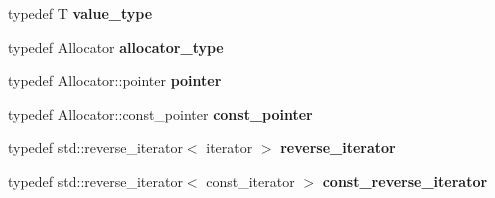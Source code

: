 \begin{DoxyCompactItemize}
\item 
\hypertarget{classyasli_1_1vector_aabb5f01a448959bbcc2ee3730ad73fac}{}typedef T {\bfseries value\+\_\+type}\label{classyasli_1_1vector_aabb5f01a448959bbcc2ee3730ad73fac}

\item 
\hypertarget{classyasli_1_1vector_a91db12c7a508c18d0dcf77b5cdeb5b08}{}typedef Allocator {\bfseries allocator\+\_\+type}\label{classyasli_1_1vector_a91db12c7a508c18d0dcf77b5cdeb5b08}

\item 
\hypertarget{classyasli_1_1vector_a68f49c805e21553dc6d621db3c05fb10}{}typedef Allocator\+::pointer {\bfseries pointer}\label{classyasli_1_1vector_a68f49c805e21553dc6d621db3c05fb10}

\item 
\hypertarget{classyasli_1_1vector_a9d3ad5aa0843bde0f5a0c766cb6b5767}{}typedef Allocator\+::const\+\_\+pointer {\bfseries const\+\_\+pointer}\label{classyasli_1_1vector_a9d3ad5aa0843bde0f5a0c766cb6b5767}

\item 
\hypertarget{classyasli_1_1vector_a231646e387537d7c9763e7b557d12137}{}typedef std\+::reverse\+\_\+iterator$<$ iterator $>$ {\bfseries reverse\+\_\+iterator}\label{classyasli_1_1vector_a231646e387537d7c9763e7b557d12137}

\item 
\hypertarget{classyasli_1_1vector_a081ac98480e25a062ad64604aac263ef}{}typedef std\+::reverse\+\_\+iterator$<$ const\+\_\+iterator $>$ {\bfseries const\+\_\+reverse\+\_\+iterator}\label{classyasli_1_1vector_a081ac98480e25a062ad64604aac263ef}

\end{DoxyCompactItemize}

